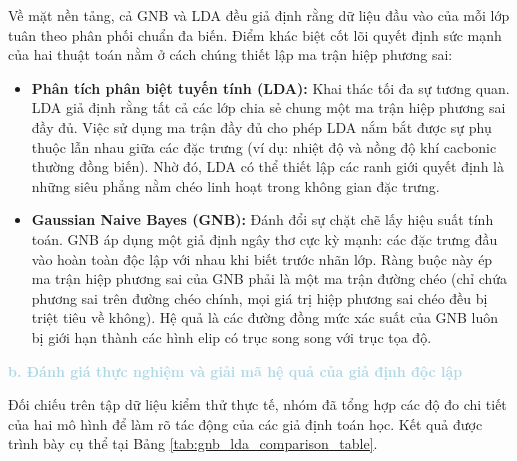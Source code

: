 Về mặt nền tảng, cả GNB và LDA đều giả định rằng dữ liệu đầu vào của mỗi lớp tuân theo phân phối chuẩn đa biến. Điểm khác biệt cốt lõi quyết định sức mạnh của hai thuật toán nằm ở cách chúng thiết lập ma trận hiệp phương sai:

\begin{itemize}
    \item \textbf{Phân tích phân biệt tuyến tính (LDA):} Khai thác tối đa sự tương quan. LDA giả định rằng tất cả các lớp chia sẻ chung một ma trận hiệp phương sai đầy đủ. Việc sử dụng ma trận đầy đủ cho phép LDA nắm bắt được sự phụ thuộc lẫn nhau giữa các đặc trưng (ví dụ: nhiệt độ và nồng độ khí cacbonic thường đồng biến). Nhờ đó, LDA có thể thiết lập các ranh giới quyết định là những siêu phẳng nằm chéo linh hoạt trong không gian đặc trưng.
    \item \textbf{Gaussian Naive Bayes (GNB):} Đánh đổi sự chặt chẽ lấy hiệu suất tính toán. GNB áp dụng một giả định ngây thơ cực kỳ mạnh: các đặc trưng đầu vào hoàn toàn độc lập với nhau khi biết trước nhãn lớp. Ràng buộc này ép ma trận hiệp phương sai của GNB phải là một ma trận đường chéo (chỉ chứa phương sai trên đường chéo chính, mọi giá trị hiệp phương sai chéo đều bị triệt tiêu về không). Hệ quả là các đường đồng mức xác suất của GNB luôn bị giới hạn thành các hình elip có trục song song với trục tọa độ.
\end{itemize}

\vspace{0.5em}
\noindent\textcolor{lightblue}{\textbf{b. Đánh giá thực nghiệm và giải mã hệ quả của giả định độc lập}}
\vspace{0.5em}

Đối chiếu trên tập dữ liệu kiểm thử thực tế, nhóm đã tổng hợp các độ đo chi tiết của hai mô hình để làm rõ tác động của các giả định toán học. Kết quả được trình bày cụ thể tại Bảng \ref{tab:gnb_lda_comparison_table}.

